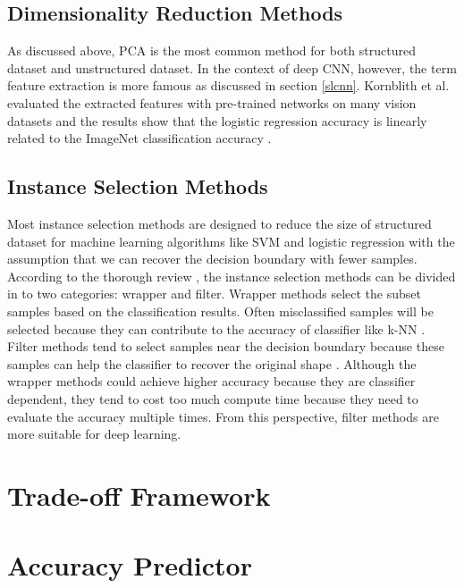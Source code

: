 \subsection{Dimensionality Reduction Methods}
As discussed above, PCA is the most common method for both structured dataset and unstructured dataset. In the context of deep CNN, however, the term feature extraction is more famous as discussed in section \ref{slcnn}. Kornblith et al. evaluated the extracted features with pre-trained networks on many vision datasets and the results show that the logistic regression accuracy is linearly related to the ImageNet classification accuracy \cite{Kornblith2018}. 

\subsection{Instance Selection Methods}
Most instance selection methods are designed to reduce the size of structured dataset for machine learning algorithms like SVM and logistic regression with the assumption that we can recover the decision boundary with fewer samples. According to the thorough review \cite{Olvera-Lopez2010}, the instance selection methods can be divided in to two categories: wrapper and filter. Wrapper methods select the subset samples based on the classification results. Often misclassified samples will be selected because they can contribute to the accuracy of classifier like k-NN \cite{Aha1991}. Filter methods tend to  select samples near the decision boundary because these samples can help the classifier to recover the original shape \cite{Riquelme2003a}. Although the wrapper methods could achieve higher accuracy because they are classifier dependent, they tend to cost too much compute time because they need to evaluate the accuracy multiple times. From this perspective, filter methods are more suitable for deep learning.

\section{Trade-off Framework}


\section{Accuracy Predictor}